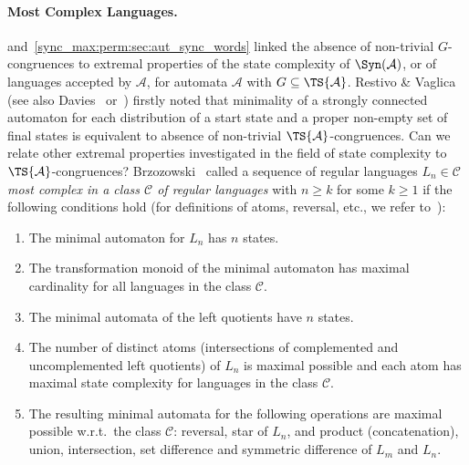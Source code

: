 \paragraph{Most Complex Languages.}  and~\ref{sync_max:perm:sec:aut_sync_words} linked the absence
of non-trivial $G$-congruences to
extremal properties of the state complexity of $\Syn(\mathcal A)$, or
of languages accepted by $\mathcal A$, for automata $\mathcal A$
with $G \subseteq \TS{\mathcal A}$.
Restivo \& Vaglica~\cite[Prop.~1]{DBLP:journals/tcs/RestivoV12} (see also Davies~\cite[Prop.~3.2]{DBLP:journals/mst/Davies18} or~\cite[Prop.~4.3.2]{DBLP:phd/basesearch/Davies19})
firstly noted that minimality of a strongly connected automaton
for each distribution of a start state 
and a proper non-empty set of final states
is equivalent to absence of non-trivial $\TS{\mathcal A}$-congruences.
Can we relate other extremal properties investigated in the field of state complexity to $\TS{\mathcal A}$-congruences?
Brzozowski~\cite{DBLP:journals/ijfcs/Brzozowski13,DBLP:conf/dcfs/BrzozowskiD18,DBLP:journals/dmtcs/BrzozowskiDL16}
called a sequence of regular languages $L_n \in \mathcal C$
\emph{most complex in a class $\mathcal C$ of regular languages}  with $n \ge k$ for some $k \ge 1$
if the following conditions hold (for definitions of atoms, reversal, etc., we refer to~\cite{DBLP:journals/ijfcs/Brzozowski13}):
\begin{enumerate}
	\item The minimal automaton for $L_n$ has $n$ states.
	\item The transformation monoid of the minimal automaton has maximal cardinality for all languages in the class $\mathcal C$. 
	\item The minimal automata of the left quotients have $n$ states.
	\item The number of distinct atoms (intersections of complemented and uncomplemented left quotients) of $L_n$ is maximal possible
	and each atom has maximal state complexity for languages in the class $\mathcal C$.
	\item The resulting minimal automata for the following operations are maximal possible w.r.t.~the class $\mathcal C$: reversal,
	star of $L_n$, and product (concatenation), union, intersection, set difference and symmetric difference of $L_m$
	and $L_n$.
\end{enumerate}

